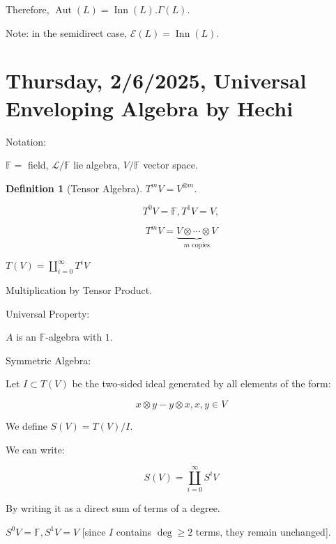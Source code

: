 \documentclass{article}
\theoremstyle{definition}
\newtheorem*{definition}{Definition}
\begin{document}
    Therefore, \(\operatorname{Aut} (L) = \operatorname{Inn} (L) . \Gamma(L)\). 

    Note: in the semidirect case, \(\mathscr{E} (L) = \operatorname{Inn} (L)\).

    \section{Thursday, 2/6/2025, Universal Enveloping Algebra by Hechi}

    Notation:

    \(\mathbb{F} =\) field, \(\mathcal{L} / \mathbb{F}\) lie algebra, \(V / \mathbb{F}\) vector space.

    \begin{definition}
        [Tensor Algebra] \(T^m V = V^{\otimes m}\).

        \[
            T^{0} V = \mathbb{F} ,T^1 V = V,
        \]

        \[
            T^m V = \underbrace{V \otimes \cdots \otimes V}_{m \text{ copies}} 
        \]

        \(T(V) = \coprod_{i=0}^{\infty} T^i V\) 

        Multiplication by Tensor Product.

    \end{definition}

    Universal Property:

    \begin{center}
    \end{center}

    \(A\) is an \(\mathbb{F}\)-algebra with \(1\).

    Symmetric Algebra:

    Let \(I \subset T(V)\) be the two-sided ideal generated by all elements of the form:

    \[
        x \otimes y - y \otimes x, x,y\in V
    \]

    We define \(S(V) = T(V) / I\).

    We can write:

    \[
        S(V) = \coprod_{i=0}^{\infty} S^i V
    \]

    By writing it as a direct sum of terms of a degree.

    \(S^0 V = \mathbb{F}, S^1 V = V\) [since \(I\) contains \(\deg \geq 2\) terms, they remain unchanged].
\end{document}
